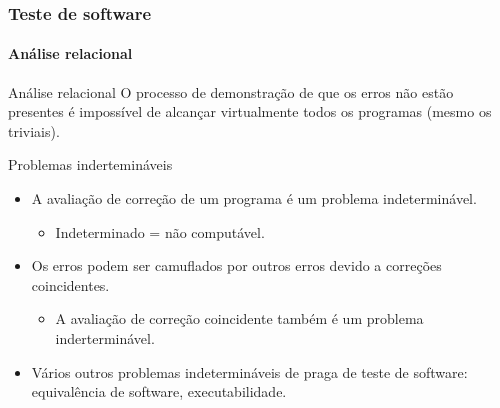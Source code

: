 \begin{frame}
\frametitle{Teste de software}
\framesubtitle{Análise relacional}

\begin{block:principle}{Análise relacional}
O processo de demonstração de que os erros não estão presentes é impossível de alcançar virtualmente todos os programas (mesmo os triviais).
\end{block:principle}

\begin{block:fact}{Problemas indertemináveis}
\begin{itemize}
	\item A avaliação de correção de um programa é um problema indeterminável.
	\begin{itemize}
		\item Indeterminado = não computável.
	\end{itemize}

	\item Os erros podem ser camuflados por outros erros devido a correções coincidentes.
	\begin{itemize}
		\item A avaliação de correção coincidente também é um problema inderterminável.
	\end{itemize}

	\item Vários outros problemas indetermináveis de praga de teste de software: equivalência de software, executabilidade.
\end{itemize}
\end{block:fact}
\end{frame}


